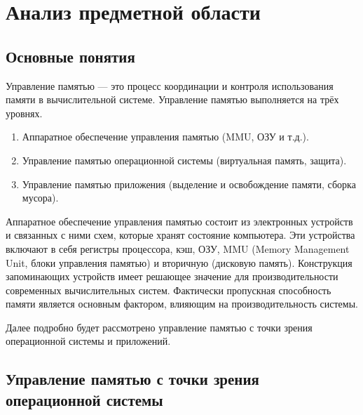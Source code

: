 \chapter{Анализ предметной области}

\section{Основные понятия}

Управление памятью \cite{glossary} --- это процесс координации и контроля использования памяти в вычислительной системе. Управление памятью выполняется на трёх уровнях. 

\begin{enumerate}[label*=\arabic*)]
	\item Аппаратное обеспечение управления памятью (MMU, ОЗУ и т.д.).
	\item Управление памятью операционной системы (виртуальная память, защита).
	\item Управление памятью приложения (выделение и освобождение памяти, сборка мусора).
\end{enumerate}

Аппаратное обеспечение управления памятью состоит из электронных устройств и связанных с ними схем, которые хранят состояние компьютера. Эти устройства включают в себя регистры процессора, кэш, ОЗУ, MMU (Memory Management Unit, блоки управления памятью) и вторичную (дисковую память). Конструкция запоминающих устройств имеет решающее значение для производительности современных вычислительных систем. Фактически пропускная способность памяти является основным фактором, влияющим на производительность системы. \cite{glossary}

Далее подробно будет рассмотрено управление памятью с точки зрения операционной системы и приложений.



\section{Управление памятью с точки зрения операционной системы}

